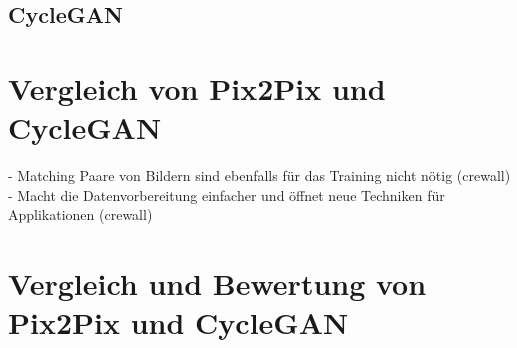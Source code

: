\subsection{CycleGAN}

\section{Vergleich von Pix2Pix und CycleGAN}
- Matching Paare von Bildern sind ebenfalls für das Training nicht nötig (crewall)
- Macht die Datenvorbereitung einfacher und öffnet neue Techniken für Applikationen (crewall)
\section{Vergleich und Bewertung von Pix2Pix und CycleGAN}